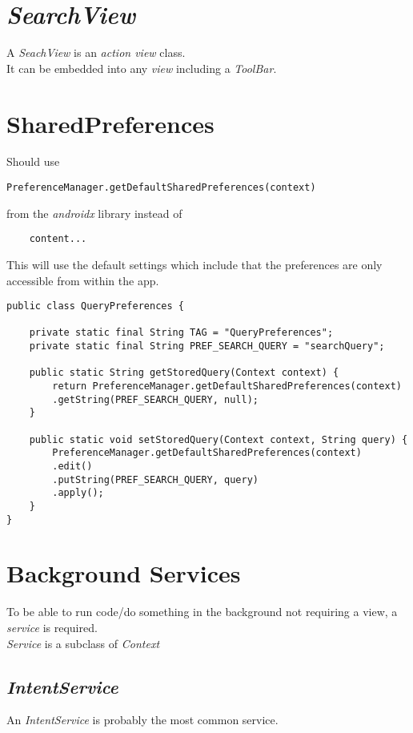 \documentclass[]{article}
\renewcommand{\it}[1]{\textit{#1}}
\begin{document}
\section{\it{SearchView}}
A \it{SeachView} is an \it{action view} class.
\\
It can be embedded into any \it{view} including a \it{ToolBar}.

\section{SharedPreferences}
Should use 
\begin{lstlisting}
PreferenceManager.getDefaultSharedPreferences(context)
\end{lstlisting}
from the \it{androidx} library instead of 
\begin{lstlisting}
	content...
\end{lstlisting}
This will use the default settings which include that the preferences are only accessible from within the app.
\begin{lstlisting}
public class QueryPreferences {
	
	private static final String TAG = "QueryPreferences";
	private static final String PREF_SEARCH_QUERY = "searchQuery";
	
	public static String getStoredQuery(Context context) {
		return PreferenceManager.getDefaultSharedPreferences(context)
		.getString(PREF_SEARCH_QUERY, null);
	}
	
	public static void setStoredQuery(Context context, String query) {
		PreferenceManager.getDefaultSharedPreferences(context)
		.edit()
		.putString(PREF_SEARCH_QUERY, query)
		.apply();
	}
}
\end{lstlisting}

\section{Background Services}
To be able to run code/do something in the background not requiring a view, a \it{service} is required.
\\
\it{Service} is a subclass of \it{Context}
\subsection{\it{IntentService}}
An \it{IntentService} is probably the most common service.
\end{document}
